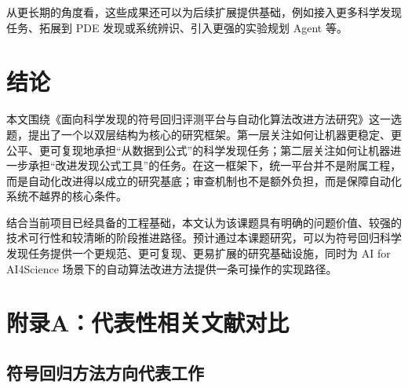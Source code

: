 \documentclass[UTF8,12pt]{ctexart}
\begin{document}
从更长期的角度看，这些成果还可以为后续扩展提供基础，例如接入更多科学发现任务、拓展到 PDE 发现或系统辨识、引入更强的实验规划 Agent 等。

\section{结论}

本文围绕《面向科学发现的符号回归评测平台与自动化算法改进方法研究》这一选题，提出了一个以双层结构为核心的研究框架。第一层关注如何让机器更稳定、更公平、更可复现地承担“从数据到公式”的科学发现任务；第二层关注如何让机器进一步承担“改进发现公式工具”的任务。在这一框架下，统一平台并不是附属工程，而是自动化改进得以成立的研究基底；审查机制也不是额外负担，而是保障自动化系统不越界的核心条件。

结合当前项目已经具备的工程基础，本文认为该课题具有明确的问题价值、较强的技术可行性和较清晰的阶段推进路径。预计通过本课题研究，可以为符号回归科学发现任务提供一个更规范、更可复现、更易扩展的研究基础设施，同时为 AI for AI4Science 场景下的自动算法改进方法提供一条可操作的实现路径。

\clearpage
\appendix

\section{附录A：代表性相关文献对比}

\subsection{符号回归方法方向代表工作}
\end{document}
